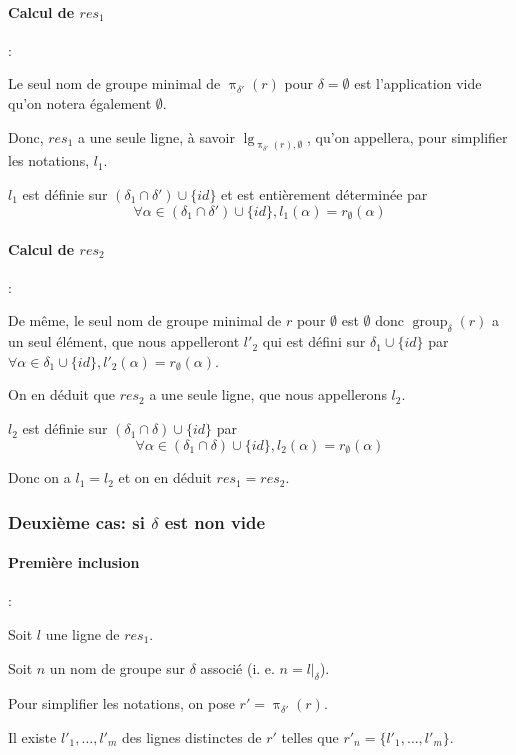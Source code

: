 \documentclass[french]{article}
\DeclareMathOperator{\proj}{\pi}
\DeclareMathOperator{\group}{group}
\DeclareMathOperator{\lgr}{lg}
\newcommand{\groupDelta}{\group_{\delta}}
\newcommand{\cip}{\cup \{id\}}
\begin{document}
\paragraph*{Calcul de $res_1$}:

Le seul nom de groupe minimal de $\proj_{\delta'}(r)$
pour $\delta = \emptyset$ est l'application vide
qu'on notera également $\emptyset$.

Donc, $res_1$ a une seule ligne, à savoir
$\lgr_{\proj_{\delta'}(r), \emptyset}$,
qu'on appellera, pour simplifier les notations,
$l_1$.

$l_1$ est définie sur $(\delta_1 \cap \delta') \cip$
et est entièrement déterminée par
$$
\forall \alpha \in (\delta_1 \cap \delta') \cip,
l_1(\alpha) = r_\emptyset(\alpha)
$$

\paragraph*{Calcul de $res_2$}:

De même, le seul nom de groupe minimal de
$r$ pour $\emptyset$ est $\emptyset$
donc $\groupDelta(r)$ a un seul élément,
que nous appelleront $l'_2$ qui est défini
sur $\delta_1 \cip$ par
$\forall \alpha \in \delta_1 \cip, l'_2(\alpha) = r_\emptyset(\alpha)$.

On en déduit que $res_2$ a une seule ligne, que nous
appellerons $l_2$.

$l_2$ est définie sur 
$(\delta_1 \cap \delta) \cip$ par 
$$\forall \alpha \in (\delta_1 \cap \delta) \cip, l_2(\alpha) = r_\emptyset(\alpha)$$

Donc on a
$l_1 = l_2$
et on en déduit $res_1 = res_2$.

\subsubsection*{Deuxième cas: si $\delta$ est non vide}
\paragraph*{Première inclusion} :

Soit $l$ une ligne de $res_1$.

Soit $n$ un nom de groupe sur $\delta$ associé
(i. e. $n = l|_\delta$).

Pour simplifier les notations, on pose
$r' = \proj_{\delta'}(r)$.

Il existe $l'_1, \dots, l'_m$ des lignes distinctes de
$r'$ telles que $r'_n = \{l'_1, \dots, l'_m \}$.
\end{document}
